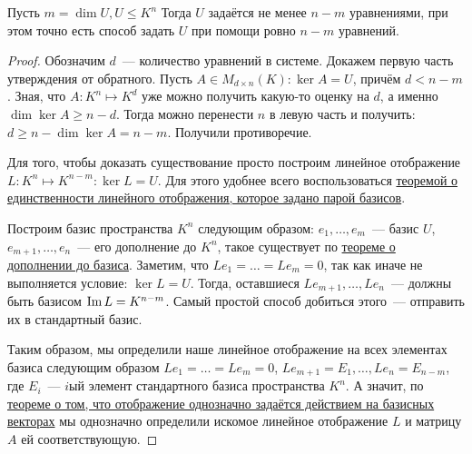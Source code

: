 \begin{statement}
    Пусть $m = \dim U, U\leq K^n$ Тогда $U$ задаётся не менее $n - m$ уравнениями, при этом
    точно есть способ задать $U$ при помощи ровно $n - m$ уравнений.
\end{statement}
\begin{proof}
    Обозначим $d$~--- количество уравнений в системе. Докажем первую часть утверждения от обратного. 
    Пусть $A\in M_{d\times n}(K)\colon \ker A = U$, причём $d < n - m$.
    Зная, что $A\colon K^n\mapsto K^d$ уже можно получить какую-то оценку на $d$, 
    а именно $\dim \ker A \geq n - d$. Тогда можно перенести $n$ в левую часть и получить:
    $d \geq n - \dim \ker A =  n - m$. Получили противоречие.

    Для того, чтобы доказать существование просто построим линейное отображение $L: K^n\mapsto K^{n-m}\colon
    \ker L = U$. Для этого удобнее всего воспользоваться 
    \hyperref[thm:Линейное отображение определяется действием на базисных векторах]{теоремой о единственности линейного
    отображения, которое задано парой базисов}.

    Построим базис пространства $K^n$ следующим образом:  $e_1,\dots,e_m$~--- базис $U$,
    $e_{m + 1},\dots, e_n$~--- его дополнение до $K^n$, такое существует по 
    \hyperref[thm:О дополнении до базиса]{теореме о дополнении до базиса}.
    Заметим, что $Le_1 = \dots = Le_m = 0$, так как иначе не выполняется условие: $\ker L = U$. 
    Тогда, оставшиеся $Le_{m + 1},\dots, Le_n$~--- должны быть базисом $\operatorname{Im} L = K^{n - m}$.
    Самый простой способ добиться этого~--- отправить их в стандартный базис.
    
    Таким образом, мы определили наше линейное отображение на всех элементах базиса
    следующим образом $Le_1 = \dots = Le_m = 0$, $Le_{m + 1} = E_1, \dots, Le_n = E_{n - m}$,
    где $E_i$~--- $i$ый элемент стандартного базиса пространства $K^n$. А значит, по 
    \hyperref[thm:Линейное отображение определяется действием на базисных векторах]
    {теореме о том, что отображение однозначно задаётся действием на базисных векторах}
    мы однозначно определили искомое линейное отображение $L$ и матрицу $A$ ей соответствующую.
\end{proof}
